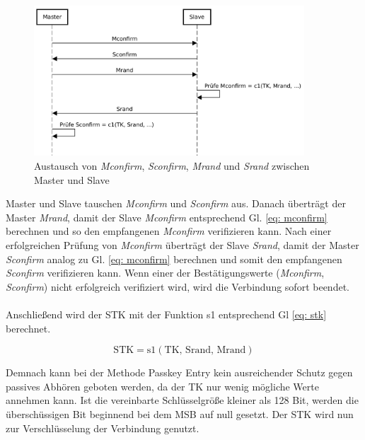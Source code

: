 \begin{figure}[H]
    \centering
    \includegraphics[width=0.9\textwidth]{graphics/austausch_vor_stk_generierung.pdf}
    \caption[Austausch von \textit{Mconfirm}, \textit{Sconfirm}, \textit{Mrand} und \textit{Srand} zwischen Master und Slave]{Austausch von \textit{Mconfirm}, \textit{Sconfirm}, \textit{Mrand} und \textit{Srand} zwischen Master und Slave \cite{BtSpec4.2_2305-2306}}
    \label{fig: austausch vor stk generierung}
\end{figure}

Master und Slave tauschen \textit{Mconfirm} und \textit{Sconfirm} aus. Danach überträgt der Master \textit{Mrand}, damit der Slave \textit{Mconfirm} entsprechend Gl. \ref{eq: mconfirm} berechnen und so den empfangenen \textit{Mconfirm} verifizieren kann. Nach einer erfolgreichen Prüfung von \textit{Mconfirm} überträgt der Slave \textit{Srand}, damit der Master \textit{Sconfirm} analog zu Gl. \ref{eq: mconfirm} berechnen und somit den empfangenen \textit{Sconfirm} verifizieren kann. Wenn einer der Bestätigungswerte (\textit{Mconfirm}, \textit{Sconfirm}) nicht erfolgreich verifiziert wird, wird die Verbindung sofort beendet.
\\\\
Anschließend wird der STK mit der Funktion s1 \cite{BtSpec4.2_2290} 
entsprechend Gl \ref{eq: stk} \cite{BtSpec4.2_2305-2306} berechnet.

\begin{equation}
    \text{STK} = \text{s1}(\text{TK, Srand, Mrand})
    \label{eq: stk}
\end{equation}

Demnach kann bei der Methode Passkey Entry kein ausreichender Schutz gegen passives Abhören geboten werden, da der TK nur wenig mögliche Werte annehmen kann. Ist die vereinbarte Schlüsselgröße kleiner als 128 Bit, werden die überschüssigen Bit beginnend bei dem MSB auf null gesetzt. Der STK wird nun zur Verschlüsselung der Verbindung genutzt. \cite{BtSpec4.2_2305-2306}


